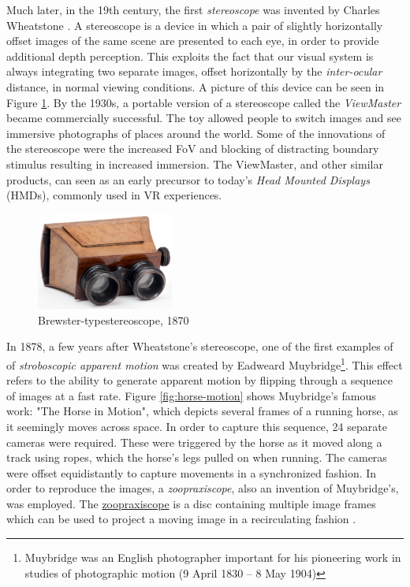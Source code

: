 Much later, in the 19th century, the first \textit{stereoscope} was invented by Charles Wheatstone \cite{hemstrom2020comparison}. A stereoscope is a device in which a pair of slightly horizontally offset images of the same scene are presented to each eye, in order to provide additional depth perception. This exploits the fact that our visual system is always integrating two separate images, offset horizontally by the \textit{inter-ocular} distance, in normal viewing conditions. A picture of this device can be seen in Figure \ref{img:stereoscope}. By the 1930s, a portable version of a stereoscope called the \textit{ViewMaster} became commercially successful. The toy allowed people to switch images and see immersive photographs of places around the world. Some of the innovations of the stereoscope were the increased FoV and blocking of distracting boundary stimulus resulting in increased immersion. The ViewMaster, and other similar products, can seen as an early precursor to today's \textit{Head Mounted Displays} (HMDs), commonly used in VR experiences. 

\begin{figure}[ht!]%
\centering
\includegraphics[width=0.4\textwidth]{img/stereoscope.jpg} 
\caption{Brewster-type\protect\footnotemark stereoscope, 1870 \cite{FileIGB032online}}
\label{img:stereoscope}
\end{figure}


In 1878, a few years after Wheatstone's stereoscope, one of the first examples of of \textit{stroboscopic apparent motion} was created by Eadweard Muybridge\footnote{Muybridge was an English photographer important for his pioneering work in studies of photographic motion (9 April 1830 – 8 May 1904)}. This effect refers to the ability to generate apparent motion by flipping through a sequence of images at a fast rate. Figure \ref{fig:horse-motion} shows Muybridge's famous work: "The Horse in Motion", which depicts several frames of a running horse, as it seemingly moves across space. In order to capture this sequence, 24 separate cameras were required. These were triggered by the horse as it moved along a track using ropes, which the horse's legs pulled on when running. The cameras were offset equidistantly to capture movements in a synchronized fashion. In order to reproduce the images, a \textit{zoopraxiscope}, also an invention of Muybridge's, was employed. The \href{https://upload.wikimedia.org/wikipedia/commons/0/06/The_zoopraxiscope-Horse_galloping-Animated.gif}{zoopraxiscope} is a disc containing multiple image frames which can be used to project a moving image in a recirculating fashion \cite{lavalle2016virtual}. 

